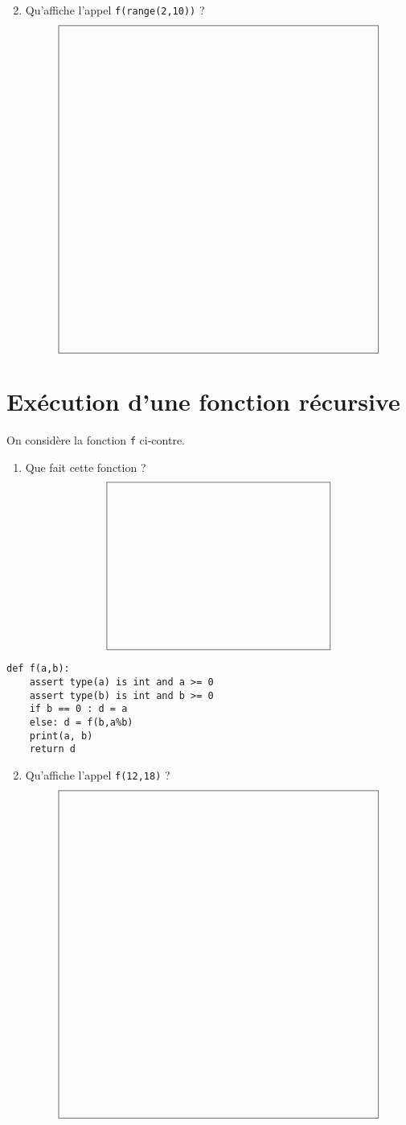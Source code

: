 \documentclass[11pt,a4paper]{article}
\begin{document}
\begin{enumerate}\setcounter{enumi}{1}
\item Qu'affiche l'appel {\tt f(range(2,10))} ?
	$$\framebox[10cm]{$\rule{0cm}{10cm}$}$$
\end{enumerate}

\section{Exécution d'une fonction récursive}

\begin{minipage}[t]{8cm}
On considère la fonction {\tt f} ci-contre.
\begin{enumerate}
\item Que fait cette fonction ?
	$$\framebox[7cm]{$\rule{0cm}{5cm}$}$$
\end{enumerate}
\end{minipage}
\hfill
\begin{py}{7cm}
\begin{verbatim}
def f(a,b):
    assert type(a) is int and a >= 0
    assert type(b) is int and b >= 0
    if b == 0 : d = a
    else: d = f(b,a%b)
    print(a, b)
    return d
\end{verbatim}
\end{py}

\begin{enumerate}\setcounter{enumi}{1}
\item Qu'affiche l'appel {\tt f(12,18)} ?
	$$\framebox[10cm]{$\rule{0cm}{10cm}$}$$
\end{enumerate}


\label{fini}
\end{document}
